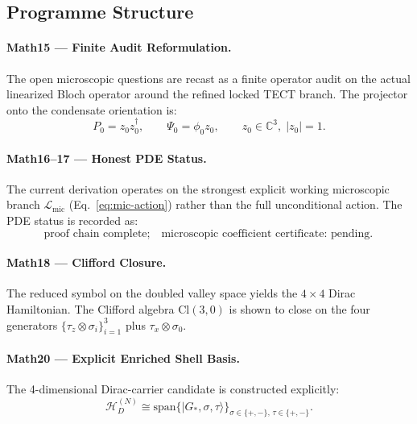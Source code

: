 \documentclass[reprint,aps,pre,onecolumn,superscriptaddress,amsmath,amssymb]{revtex4-2}
\newcommand{\Gstar}{G_{*}}
\begin{document}
\subsection{Programme Structure}

\paragraph{Math15 --- Finite Audit Reformulation.}
The open microscopic questions are recast as a finite operator audit on the
actual linearized Bloch operator around the refined locked TECT branch.
The projector onto the condensate orientation is:
\begin{equation}
  P_{0} = z_{0}z_{0}^{\dagger},
  \qquad \Psi_{0} = \phi_{0} z_{0},
  \qquad z_{0} \in \mathbb{C}^{3},\; |z_{0}|=1.
  \label{eq:projector}
\end{equation}

\paragraph{Math16--17 --- Honest PDE Status.}
The current derivation operates on the strongest explicit working microscopic branch
$\mathcal{L}_{\mathrm{mic}}$ (Eq.~\ref{eq:mic-action}) rather than the full
unconditional action. The PDE status is recorded as:
\begin{equation}
  \boxed{
    \text{proof chain complete};\quad
    \text{microscopic coefficient certificate: pending.}
  }
  \label{eq:PDE-status}
\end{equation}

\paragraph{Math18 --- Clifford Closure.}
The reduced symbol on the doubled valley space yields the
$4\times 4$ Dirac Hamiltonian. The Clifford algebra
$\mathrm{Cl}(3,0)$ is shown to close on the four generators
$\{\tau_{z}\otimes\sigma_{i}\}_{i=1}^{3}$ plus $\tau_{x}\otimes\sigma_{0}$.

\paragraph{Math20 --- Explicit Enriched Shell Basis.}
The 4-dimensional Dirac-carrier candidate is constructed explicitly:
\begin{equation}
  \mathcal{H}_{D}^{(N)}
  \cong
  \mathrm{span}\{|\Gstar,\sigma,\tau\rangle\}_{\sigma\in\{+,-\},\,\tau\in\{+,-\}}.
  \label{eq:HD-explicit}
\end{equation}
\end{document}
